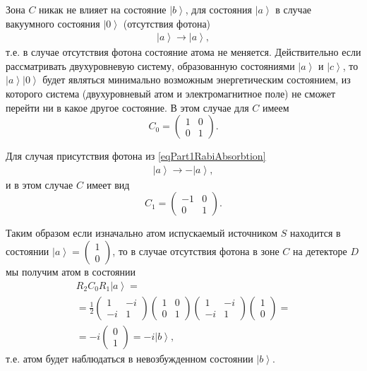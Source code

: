 Зона $C$ никак не влияет на состояние $\left|b\right>$, для состояния
$\left|a\right>$ в случае вакуумного состояния $\left|0\right>$
(отсутствия фотона)
\begin{eqnarray}
  \left|a\right> \rightarrow \left|a\right>,
  \nonumber
\end{eqnarray}
т.е. в случае отсутствия фотона состояние атома не
меняется. Действительно если рассматривать двухуровневую систему,
образованную состояниями $\left|a\right>$ и $\left|c\right>$, то
$\left|a\right>\left|0\right>$ будет являться минимально возможным
энергетическим состоянием, из которого система (двухуровневый атом и
электромагнитное поле) не сможет перейти ни в
какое другое состояние.
В этом случае для $C$ имеем
\[
C_0 = \left(
\begin{array} {cc}
1 & 0
\\
0 & 1 
\end{array}
\right).
\]

Для случая присутствия фотона из \eqref{eqPart1RabiAbsorbtion}
\begin{eqnarray}
  \left|a\right> \rightarrow -\left|a\right>,
  \nonumber
\end{eqnarray}
и в этом случае $C$ имеет вид
\[
C_1 = \left(
\begin{array} {cc}
-1 & 0
\\
0 & 1 
\end{array}
\right).
\]

Таким образом если изначально атом испускаемый источником $S$
находится в состоянии $\left|a\right> = \left(
\begin{array} {c}
1
\\
0
\end{array}
\right)$, то в случае отсутствия фотона в зоне $C$ на детекторе $D$ мы
получим атом в состоянии
\begin{eqnarray}
  R_2 C_0 R_1 \left|a\right> =
  \nonumber \\
  =
  \frac{1}{2}
  \left(
  \begin{array} {cc}
    1 & -i
    \\
    -i & 1 
  \end{array}
  \right)
  \left(
  \begin{array} {cc}
    1 & 0
    \\
    0 & 1 
  \end{array}
  \right)
  \left(
  \begin{array} {cc}
    1 & -i
    \\
    -i & 1 
  \end{array}
  \right)
  \left(
  \begin{array} {c}
    1
    \\
    0
  \end{array}
  \right) =
  \nonumber \\
  =
  -i 
  \left(
  \begin{array} {c}
    0
    \\
    1
  \end{array}
  \right) =
  -i \left|b\right>,
  \nonumber
\end{eqnarray}
т.е. атом будет наблюдаться в невозбужденном состоянии
$\left|b\right>$.

